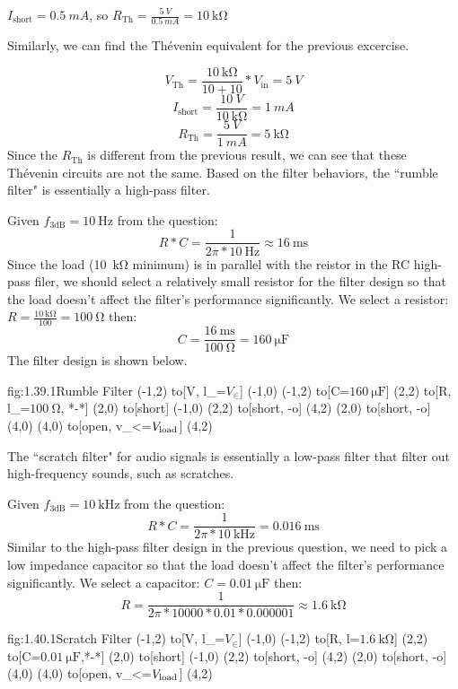$I_\text{short} = \SI{0.5}{mA}$, so $R_\text{Th} = \frac{\SI{5}{V}}{\SI{0.5}{mA}}= \SI{10}{\kohm}$

Similarly, we can find the Thévenin equivalent for the previous excercise.

\[V_\text{Th} = \frac{\SI{10}{\kohm}}{10+10}*V_\text{in} = \SI{5}{V}\]
\[I_\text{short} =\frac{\SI{10}{V}}{\SI{10}{\kohm}} = \SI{1}{mA}\]
\[R_\text{Th} = \frac{\SI{5}{V}}{\SI{1}{mA}} = \SI{5}{\kohm}\]
Since the $R_\text{Th}$ is different from the previous result, we can see that these Thévenin circuits are not the same.
Based on the filter behaviors, the ``rumble filter" is essentially a high-pass filter. 

Given $f_\text{3dB} = \SI{10}{\Hz}$ from the question:
\[R*C = \frac{1}{2\pi*\SI{10}{\Hz}} \approx \SI{16}{\ms} \]
Since the load (\SI{10}{\kohm} minimum) is in parallel with the reistor in the RC high-pass filer, we should select a relatively small resistor for the filter design 
so that the load doesn't affect the filter's performance significantly. 
We select a resistor: $R = \frac{\SI{10}{\kohm}}{100}=\SI{100}{\ohm}$ then:
\[C = \frac{\SI{16}{\ms}}{\SI{100}{\ohm}} = \SI{160}{\micro\farad}\]
The filter design is shown below.
\begin{circuit}{fig:1.39.1}{Rumble Filter}
    (-1,2) to[V, l_=$V_\in$] (-1,0)
    (-1,2) to[C=$\SI{160}{\micro\farad}$] (2,2)
    to[R, l_=$\SI{100}{\ohm}$, *-*] (2,0)
    to[short] (-1,0)
    (2,2)  to[short, -o] (4,2)
    (2,0) to[short, -o] (4,0)
    (4,0) to[open, v_<=$V_{\text{load}}$] (4,2)
\end{circuit}

The ``scratch filter" for audio signals is essentially a low-pass filter that filter out high-frequency sounds, such as scratches.

Given $f_\text{3dB} = \SI{10}{\kHz}$ from the question:
\[R*C = \frac{1}{2\pi*\SI{10}{\kHz}} = \SI{0.016}{\ms} \]
Similar to the high-pass filter design in the previous question, we need to pick a low impedance capacitor so that the load doesn't affect the filter's performance significantly. 
We select a capacitor: $C =\SI{0.01}{\micro\farad}$ then:
\[R = \frac{1}{2\pi*10000*0.01*0.000001} \approx \SI{1.6}{\kohm}\]
\begin{circuit}{fig:1.40.1}{Scratch Filter}
    (-1,2) to[V, l_=$V_\in$] (-1,0)
    (-1,2) to[R, l=$\SI{1.6}{\kohm}$] (2,2)
    to[C=$\SI{0.01}{\micro\farad}$,*-*] (2,0)
    to[short] (-1,0)
    (2,2)  to[short, -o] (4,2)
    (2,0) to[short, -o] (4,0)
    (4,0) to[open, v_<=$V_{\text{load}}$] (4,2)
\end{circuit}

